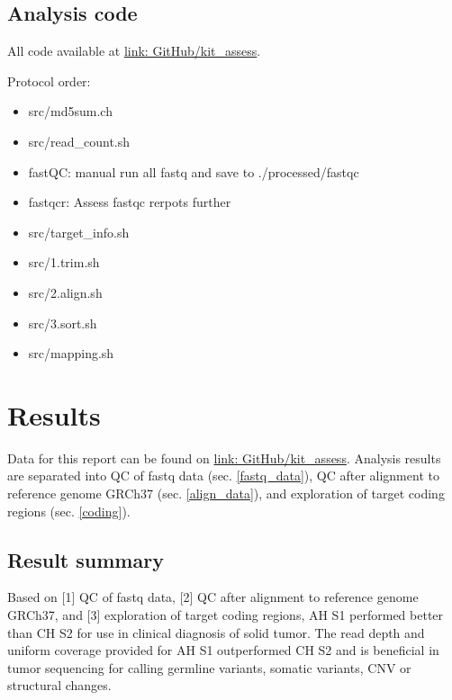 \documentclass{article}
\begin{document}
\subsection{Analysis code}
All code available at \href{https://github.com/DylanLawless/kit_assess}{link: GitHub/kit\_assess}. 

Protocol order:
\begin{itemize}
\item src/md5sum.ch
\item src/read\_count.sh
\item fastQC: manual run all fastq and save to ./processed/fastqc
\item fastqcr: Assess fastqc rerpots further
\item src/target\_info.sh
\item src/1.trim.sh
\item src/2.align.sh
\item src/3.sort.sh
\item src/mapping.sh
\end{itemize}

\section{Results}
Data for this report can be found on \href{https://github.com/DylanLawless/kit_assess}{link: GitHub/kit\_assess}. 
Analysis results are separated into QC of fastq data (sec. \ref{fastq_data}), QC after alignment to reference genome GRCh37 (sec. \ref{align_data}), and exploration of target coding regions 
(sec. \ref{coding}).

\subsection{Result summary}
\label{result_summary}

Based on 
[1] QC of fastq data,
[2] QC after alignment to reference genome GRCh37, and 
[3] exploration of target coding regions,
AH S1 performed better than CH S2 for use in clinical diagnosis of solid tumor.
The read depth and uniform coverage provided for AH S1 outperformed CH S2 and is beneficial in tumor sequencing for calling germline variants, somatic variants, CNV or structural changes.
\end{document}
